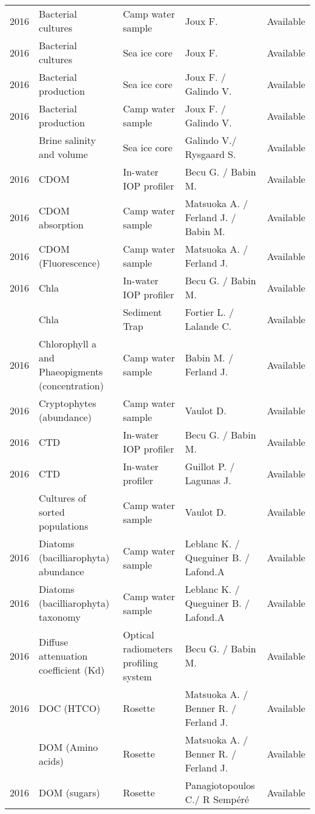 \documentclass[]{article}
\begin{document}
\begin{landscape}
\begin{longtable}{rllll}
2016 & Bacterial cultures & Camp water sample & Joux F. & Available\\
2016 & Bacterial cultures & Sea ice core & Joux F. & Available\\
2016 & Bacterial production & Sea ice core & Joux F. / Galindo V. & Available\\
2016 & Bacterial production & Camp water sample & Joux F. / Galindo V. & Available\\
\addlinespace
2016 & Brine salinity and volume & Sea ice core & Galindo V./ Rysgaard S. & Available\\
2016 & CDOM & In-water IOP profiler & Becu G. / Babin M. & Available\\
2016 & CDOM absorption & Camp water sample & Matsuoka A. / Ferland J. / Babin M. & Available\\
2016 & CDOM (Fluorescence) & Camp water sample & Matsuoka A. / Ferland J. & Available\\
2016 & Chla & In-water IOP profiler & Becu G. / Babin M. & Available\\
\addlinespace
2016 & Chla & Sediment Trap & Fortier L. / Lalande C. & Available\\
2016 & Chlorophyll a and Phaeopigments (concentration) & Camp water sample & Babin M. / Ferland J. & Available\\
2016 & Cryptophytes (abundance) & Camp water sample & Vaulot D. & Available\\
2016 & CTD & In-water IOP profiler & Becu G. / Babin M. & Available\\
2016 & CTD & In-water profiler & Guillot P. / Lagunas J. & Available\\
\addlinespace
2016 & Cultures of sorted populations & Camp water sample & Vaulot D. & Available\\
2016 & Diatoms (bacilliarophyta) abundance & Camp water sample & Leblanc K. / Queguiner B. / Lafond.A & Available\\
2016 & Diatoms (bacilliarophyta) taxonomy & Camp water sample & Leblanc K. / Queguiner B. / Lafond.A & Available\\
2016 & Diffuse attenuation coefficient (Kd) & Optical radiometers profiling system & Becu G. / Babin M. & Available\\
2016 & DOC (HTCO) & Rosette & Matsuoka A. / Benner R. / Ferland J. & Available\\
\addlinespace
2016 & DOM (Amino acids) & Rosette & Matsuoka A. / Benner R. / Ferland J. & Available\\
2016 & DOM (sugars) & Rosette & Panagiotopoulos C./ R Sempéré & Available\\

\end{longtable}
\end{landscape}
\end{document}
